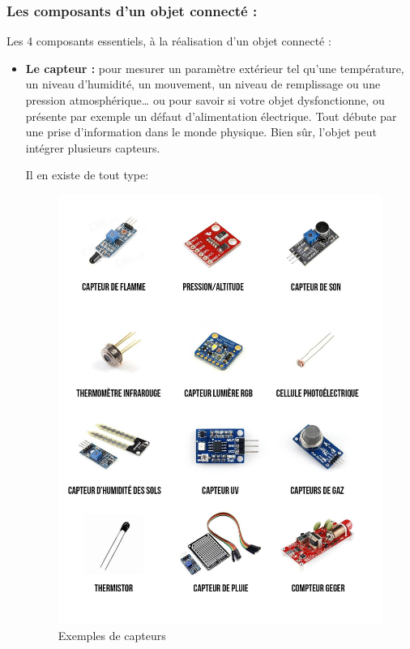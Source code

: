 \subsubsection{Les composants d’un objet connecté :}
Les 4 composants essentiels, à la réalisation d’un objet connecté :
\begin{itemize}[label=\textbullet]
\item \textbf{Le capteur :} pour mesurer un paramètre extérieur tel qu’une température, un niveau d’humidité, un mouvement, un niveau de remplissage ou une pression atmosphérique… ou pour savoir si votre objet dysfonctionne, ou présente par exemple un défaut d’alimentation électrique. Tout débute par une prise d’information dans le monde physique. Bien sûr, l’objet peut intégrer plusieurs capteurs.

Il en existe de tout type: 
\begin{figure}[h]
	\centering
    \includegraphics[scale=0.1]{img/part1/2.4}
    \caption{Exemples de capteurs}
\end{figure}


\end{itemize}

